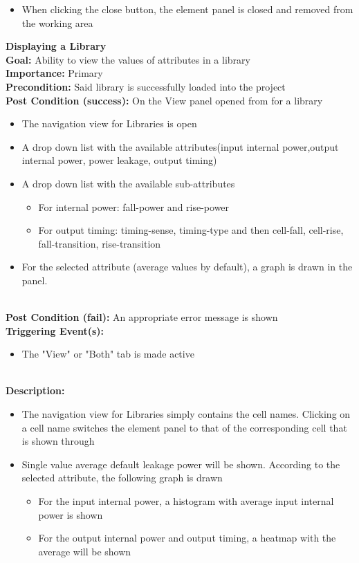 \documentclass[10pt,a4paper]{report}
\newcommand{\precondition}[1]{
    \textbf{Precondition: } #1 \leavevmode \\
}
\newcommand{\FRDescription}[8]{
    \textbf{#1} \leavevmode \\
    \textbf{Goal: } #2 \leavevmode \\
    \textbf{Importance: } #3 \leavevmode \\
    \precondition{#4}
    \textbf{Post Condition (success): } #5 \leavevmode \\
    \textbf{Post Condition (fail): } #6 \leavevmode \\
    \textbf{Triggering Event(s): } #7 \leavevmode \\
    \textbf{Description: } \leavevmode \\ 
    #8}
\begin{document}
\begin{FR}
{\begin{itemize}
        \item When clicking the close button, the element panel is closed and removed from the working area 
    \end{itemize}}
    \item \FRDescription{Displaying a Library}
    {Ability to view the values of attributes in a library}
    {Primary}
    {Said library is successfully loaded into the project}
    {On the View panel opened from \label{FR-PREVIOUS} for a library
        \begin{itemize}
            \item The navigation view for Libraries is open
            \item A drop down list with the available attributes(input internal power,output internal power, power leakage, output timing)
            \item A drop down list with the available sub-attributes
            \begin{itemize}
                \item For internal power: fall-power and rise-power
                \item For output timing: timing-sense, timing-type and then cell-fall, cell-rise, fall-transition, rise-transition
            \end{itemize}
            \item For the selected attribute (average values by default), a graph is drawn in the panel.
        \end{itemize}}
    {An appropriate error message is shown}
    {\begin{itemize}
        \item The "View" or "Both" tab is made active
    \end{itemize}}
    {\begin{itemize}
        \item The navigation view for Libraries simply contains the cell names. Clicking on a cell name switches the element panel to that of the corresponding cell that is shown through \label{FR-BLABLABLA}
        \item Single value average default leakage power will be shown. According to the selected attribute, the following graph is drawn
        \begin{itemize}
            \item For the input internal power, a histogram with average input internal power is shown
            \item For the output internal power and output timing, a heatmap with the average will be shown

\end{itemize}
\end{itemize}}
\end{FR}
\end{document}
